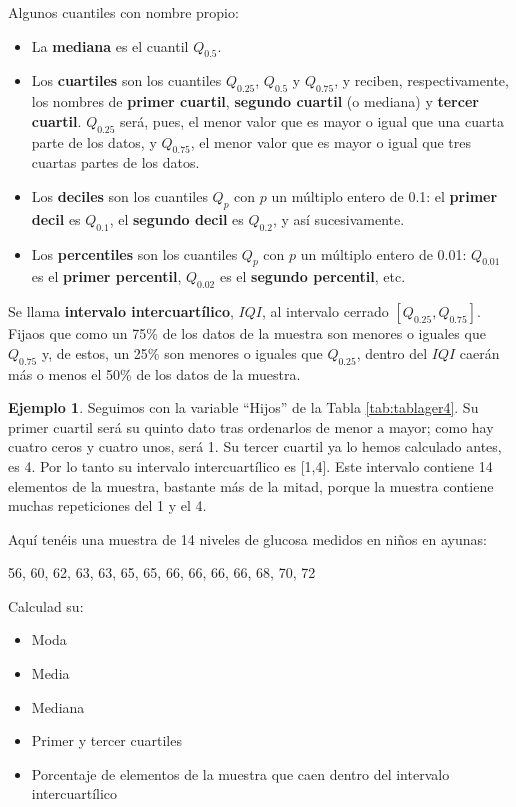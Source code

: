 \documentclass[
]{book}
\providecommand{\tightlist}{%
  \setlength{\itemsep}{0pt}\setlength{\parskip}{0pt}}
\theoremstyle{definition}
\theoremstyle{definition}
\newtheorem{example}{Ejemplo}[chapter]
\theoremstyle{definition}
\theoremstyle{definition}
\theoremstyle{remark}
\begin{document}
Algunos cuantiles con nombre propio:

\begin{itemize}
\item
  La \textbf{mediana} es el cuantil \(Q_{0.5}\).
\item
  Los \textbf{cuartiles} son los cuantiles \(Q_{0.25}\), \(Q_{0.5}\) y \(Q_{0.75}\), y reciben, respectivamente, los nombres de \textbf{primer cuartil}, \textbf{segundo cuartil} (o mediana) y \textbf{tercer cuartil}. \(Q_{0.25}\) será, pues, el menor valor que es mayor o igual que una cuarta parte de los datos, y \(Q_{0.75}\), el menor valor que es mayor o igual que tres cuartas partes de los datos.
\item
  Los \textbf{deciles} son los cuantiles \(Q_{p}\) con \(p\) un múltiplo entero de 0.1: el \textbf{primer decil} es \(Q_{0.1}\), el \textbf{segundo decil} es \(Q_{0.2}\), y así sucesivamente.
\item
  Los \textbf{percentiles} son los cuantiles \(Q_{p}\) con \(p\) un múltiplo entero de 0.01: \(Q_{0.01}\) es el \textbf{primer percentil}, \(Q_{0.02}\) es el \textbf{segundo percentil}, etc.
\end{itemize}

Se llama \textbf{intervalo intercuartílico}, \(\mathit{IQI}\), al intervalo cerrado \([Q_{0.25},Q_{0.75}]\). Fijaos que como un 75\% de los datos de la muestra son menores o iguales que \(Q_{0.75}\) y, de estos, un 25\% son menores o iguales que \(Q_{0.25}\), dentro del \(\mathit{IQI}\) caerán más o menos el 50\% de los datos de la muestra.

\begin{example}
\protect\hypertarget{exm:unnamed-chunk-262}{}\label{exm:unnamed-chunk-262}Seguimos con la variable ``Hijos'' de la Tabla \ref{tab:tablager4}. Su primer cuartil será su quinto dato tras ordenarlos de menor a mayor; como hay cuatro ceros y cuatro unos, será 1. Su tercer cuartil ya lo hemos calculado antes, es 4. Por lo tanto su intervalo intercuartílico es {[}1,4{]}. Este intervalo contiene 14 elementos de la muestra, bastante más de la mitad, porque la muestra contiene muchas repeticiones del 1 y el 4.
\end{example}

\begin{rmdexercici}
Aquí tenéis una muestra de 14 niveles de glucosa medidos en niños en ayunas:

56, 60, 62, 63, 63, 65, 65, 66, 66, 66, 66, 68, 70, 72

Calculad su:

\begin{itemize}
\tightlist
\item
  Moda
\item
  Media
\item
  Mediana
\item
  Primer y tercer cuartiles
\item
  Porcentaje de elementos de la muestra que caen dentro del intervalo intercuartílico
\end{itemize}
\end{rmdexercici}
\end{document}
